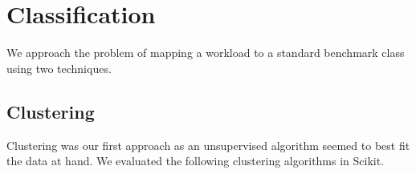 \section{Classification} \label{sec:classfication}

We approach the problem of mapping a workload to a standard benchmark class
using two techniques. 

\subsection{Clustering}
\label{sec:clustering}

Clustering was our first approach as an unsupervised algorithm seemed to best
fit the data at hand. 
We evaluated the following clustering algorithms in Scikit.\\

